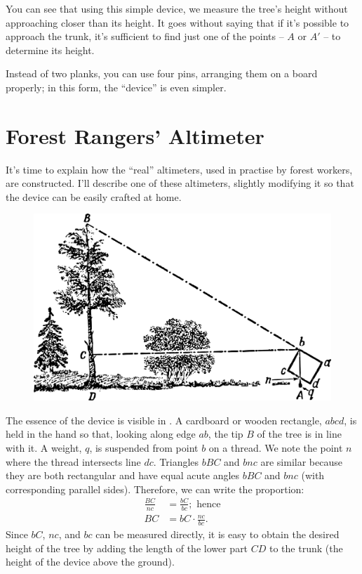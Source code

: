 You can see that using this simple device, we measure the tree's height without approaching closer than its height. It goes without saying that if it's possible to approach the trunk, it's sufficient to find just one of the points -- $A$ or $A'$ -- to determine its height.

Instead of two planks, you can use four pins, arranging them on a board properly; in this form, the ``device'' is even simpler.


\section{Forest Rangers' Altimeter}
\label{sec-1.7}

It's time to explain how the ``real'' altimeters, used in practise by forest workers, are constructed. I'll describe one of these altimeters, slightly modifying it so that the device can be easily crafted at home. 

\begin{figure}[h!]
\centering
\includegraphics[width=\textwidth]{figures/ch-01/fig-01-11.pdf}
\end{figure}


The essence of the device is visible in . A cardboard or wooden rectangle, $abcd$, is held in the hand so that, looking along edge $ab$, the tip $B$ of the tree is in line with it. A weight, $q$, is suspended from point $b$ on a thread. We note the point $n$ where the thread intersects line $dc$. Triangles $bBC$ and $bnc$ are similar because they are both rectangular and have equal acute angles $bBC$ and $bnc$ (with corresponding parallel sides). Therefore, we can write the proportion:
\begin{align*}%
\frac{BC}{nc} & = \frac{bC}{bc}; \,\, \text{hence} \\
BC & = bC \cdot \frac{nc}{bc}.
\end{align*}
Since $bC$, $nc$, and $bc$ can be measured directly, it is easy to obtain the desired height of the tree by adding the length of the lower part $CD$ to the trunk (the height of the device above the ground). 

